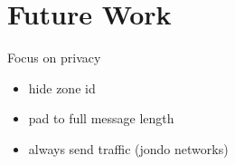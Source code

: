 \section{Future Work}
\label{sfuture}

Focus on privacy
\begin{itemize}
	\item hide zone id
	\item pad to full message length
	\item always send traffic (jondo networks)
\end{itemize}
 